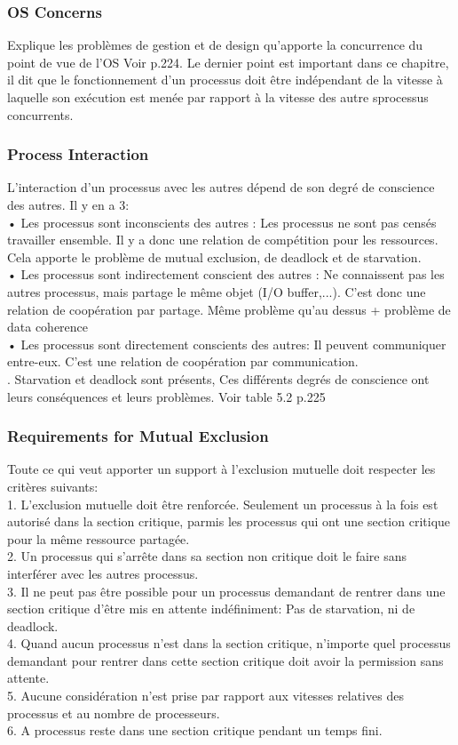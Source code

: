 \subsubsection{OS Concerns}
Explique les problèmes de gestion et de design qu’apporte la concurrence du point de vue de l’OS Voir p.224. Le dernier point est important dans ce chapitre, il dit que le fonctionnement d’un processus doit être indépendant de la vitesse à laquelle son exécution est menée par rapport à la vitesse des autre sprocessus concurrents.
\subsubsection{Process Interaction}
L’interaction d’un processus avec les autres dépend de son degré de conscience des autres. Il y en a 3: \\
• Les processus sont inconscients des autres : Les processus ne sont pas censés travailler ensemble. Il y a donc une relation de compétition pour les ressources. Cela apporte le problème de mutual exclusion, de deadlock et de starvation. \\
• Les processus sont indirectement conscient des autres : Ne connaissent pas les autres processus, mais partage le même objet (I/O buffer,...). C’est donc une relation de coopération par partage. Même problème qu’au dessus + problème de data coherence \\
• Les processus sont directement conscients des autres: Il peuvent communiquer entre-eux. C’est une relation de coopération par communication. \\
. Starvation et deadlock sont présents, Ces différents degrés de conscience ont leurs conséquences et leurs problèmes. Voir table 5.2 p.225
\subsubsection{Requirements for Mutual Exclusion}
Toute ce qui veut apporter un support à l’exclusion mutuelle doit respecter les critères suivants: \\
1. L’exclusion mutuelle doit être renforcée. Seulement un processus à la fois est autorisé dans la section critique, parmis les processus qui ont une section critique pour la même ressource partagée. \\
2. Un processus qui s’arrête dans sa section non critique doit le faire sans interférer avec les autres processus. \\
3. Il ne peut pas être possible pour un processus demandant de rentrer dans une section critique d’être mis en attente indéfiniment: Pas de starvation, ni de deadlock. \\
4. Quand aucun processus n’est dans la section critique, n’importe quel processus demandant pour rentrer dans cette section critique doit avoir la permission sans attente. \\
5. Aucune considération n’est prise par rapport aux vitesses relatives des processus et au nombre de processeurs. \\
6. A processus reste dans une section critique pendant un temps fini. \\

